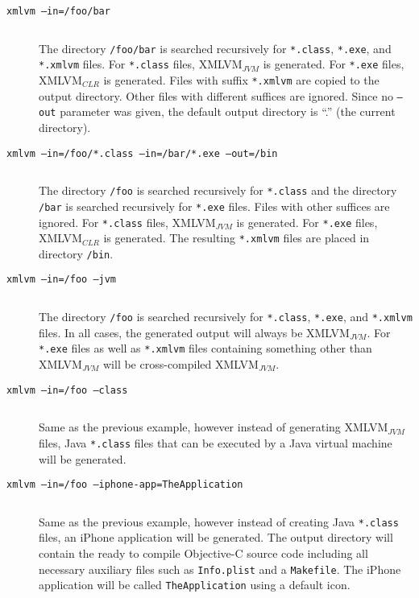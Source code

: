 \documentclass[12pt]{article}
\begin{document}
\begin{description}

\item[\texttt{xmlvm --in=/foo/bar}] $ $

  The directory \texttt{/foo/bar} is searched recursively for
  \texttt{*.class}, \texttt{*.exe}, and \texttt{*.xmlvm} files. For
  \texttt{*.class} files, XMLVM$_{JVM}$ is generated. For
  \texttt{*.exe} files, XMLVM$_{CLR}$ is generated. Files with suffix
  \texttt{*.xmlvm} are copied to the output directory. Other files
  with different suffices are ignored. Since no \texttt{--out}
  parameter was given, the default output directory is ``.'' (the
  current directory).

\item[\texttt{xmlvm --in=/foo/*.class --in=/bar/*.exe --out=/bin}] $ $

  The directory \texttt{/foo} is searched recursively for
  \texttt{*.class} and the directory \texttt{/bar} is searched
  recursively for \texttt{*.exe} files. Files with other suffices are
  ignored. For \texttt{*.class} files, XMLVM$_{JVM}$ is generated. For
  \texttt{*.exe} files, XMLVM$_{CLR}$ is generated. The resulting
  \texttt{*.xmlvm} files are placed in directory \texttt{/bin}.

\item[\texttt{xmlvm --in=/foo --jvm}] $ $

  The directory \texttt{/foo} is searched recursively for
  \texttt{*.class}, \texttt{*.exe}, and \texttt{*.xmlvm} files. In all
  cases, the generated output will always be XMLVM$_{JVM}$. For
  \texttt{*.exe} files as well as \texttt{*.xmlvm} files containing
  something other than XMLVM$_{JVM}$ will be cross-compiled
  XMLVM$_{JVM}$.

\item[\texttt{xmlvm --in=/foo --class}] $ $

  Same as the previous example, however instead of generating
  XMLVM$_{JVM}$ files, Java \texttt{*.class} files that can be
  executed by a Java virtual machine will be generated.

\item[\texttt{xmlvm --in=/foo --iphone-app=TheApplication}] $ $

  Same as the previous example, however instead of creating Java
  \texttt{*.class} files, an iPhone application will be generated. The
  output directory will contain the ready to compile Objective-C
  source code including all necessary auxiliary files such as
  \texttt{Info.plist} and a \texttt{Makefile}. The iPhone application
  will be called \texttt{TheApplication} using a default icon.


\end{description}
\end{document}
